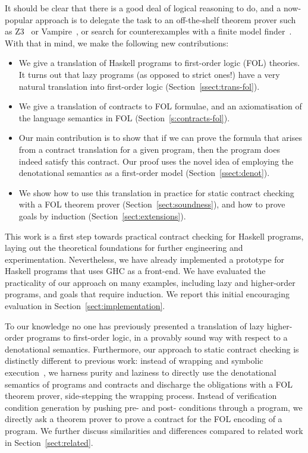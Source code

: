 It should be clear that there is a good deal of logical reasoning to do,
and a now-popular approach is to delegate the task to an off-the-shelf theorem
prover such as Z3~\cite{z3citation} or Vampire~\cite{vampire}, or search for 
counterexamples with a finite model finder~\cite{paradox}.
With that in mind, we make the following new contributions:

\begin{itemize}
  \item We give a translation of Haskell programs to first-order logic (FOL) theories. 
        It turns out that lazy programs (as opposed to
        strict ones!) have a very natural translation into first-order logic
        (Section~\ref{ssect:trans-fol}).
  \item We give a translation of contracts to FOL formulae, and an axiomatisation of 
        the language semantics in FOL 
        (Section~\ref{s:contracts-fol}).
  \item Our main contribution is to show that if we can prove the formula 
        that arises from a contract translation 
        for a given program, then the program does indeed satisfy this contract. Our proof
        uses the novel idea of employing the denotational 
        semantics as a first-order model (Section~\ref{ssect:denot}).
  \item We show how to use this translation in practice for static contract checking with
        a FOL theorem prover (Section~\ref{sect:soundness}), 
        and how to prove goals by induction (Section~\ref{sect:extensions}).
\end{itemize}

This work is a first step towards practical contract checking 
for Haskell programs, laying out the theoretical foundations for further engineering 
and experimentation. Nevertheless, we have already implemented a prototype for Haskell 
programs that uses GHC as a front-end. We have evaluated the practicality of our approach 
on many examples, including lazy and higher-order programs, and goals that require 
induction. We report this initial encouraging evaluation in 
Section~\ref{sect:implementation}. 

To our knowledge no one has previously presented a translation of lazy higher-order programs to 
first-order logic, in a provably sound way with respect to a denotational
semantics. Furthermore, our approach to static contract checking is 
distinctly different to previous work: instead of wrapping and 
symbolic execution~\cite{xu+:contracts,Xu:2012:HCC:2103746.2103767}, 
we harness purity and laziness to directly use the denotational semantics
of programs and contracts and discharge the obligations with a 
FOL theorem prover, side-stepping
the wrapping process. Instead of verification condition generation by pushing
pre- and post- conditions through a program, we directly ask a theorem prover to prove 
a contract for the FOL encoding of a program. 
We further discuss similarities and differences compared to related work in Section~\ref{sect:related}.


